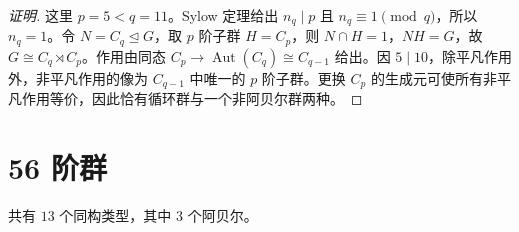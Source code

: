 \documentclass[UTF8,fontset=fandol,11pt,a4paper]{ctexart}
\newcommand{\Aut}{\operatorname{Aut}}\newcommand{\GL}{\operatorname{GL}}\newcommand{\ord}{\operatorname{ord}}\newcommand{\Z}{\mathrm Z}
\begin{document}
\begin{proof}[证明]
这里 $p=5<q=11$。Sylow 定理给出 $n_q\mid p$ 且 $n_q\equiv1\pmod q$，所以 $n_q=1$。令 $N=C_q\trianglelefteq G$，取 $p$ 阶子群 $H=C_p$，则 $N\cap H=1$，$NH=G$，故 $G\cong C_q\rtimes C_p$。作用由同态 $C_p\to\Aut(C_q)\cong C_{q-1}$ 给出。因 $5\mid 10$，除平凡作用外，非平凡作用的像为 $C_{q-1}$ 中唯一的 $p$ 阶子群。更换 $C_p$ 的生成元可使所有非平凡作用等价，因此恰有循环群与一个非阿贝尔群两种。
\end{proof}

\section*{56 阶群}\label{order:56}

共有 $13$ 个同构类型，其中 $3$ 个阿贝尔。

\begingroup\small\setlength{\tabcolsep}{3pt}\renewcommand{\arraystretch}{1.12}
\end{document}
